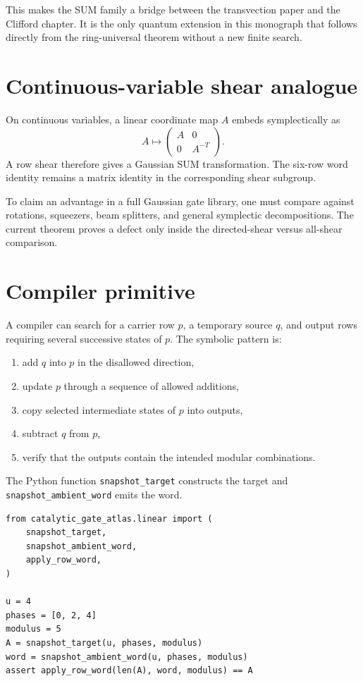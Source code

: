 This makes the SUM family a bridge between the transvection paper and the Clifford chapter.  It is the only quantum extension in this monograph that follows directly from the ring-universal theorem without a new finite search.

\section{Continuous-variable shear analogue}
On continuous variables, a linear coordinate map $A$ embeds symplectically as
\[
A\longmapsto
\begin{pmatrix}
A&0\\
0&A^{-T}
\end{pmatrix}.
\]
A row shear therefore gives a Gaussian SUM transformation.  The six-row word identity remains a matrix identity in the corresponding shear subgroup.

\begin{skeletonbox}
To claim an advantage in a full Gaussian gate library, one must compare against rotations, squeezers, beam splitters, and general symplectic decompositions.  The current theorem proves a defect only inside the directed-shear versus all-shear comparison.
\end{skeletonbox}

\section{Compiler primitive}
A compiler can search for a carrier row $p$, a temporary source $q$, and output rows requiring several successive states of $p$.  The symbolic pattern is:
\begin{enumerate}
\item add $q$ into $p$ in the disallowed direction,
\item update $p$ through a sequence of allowed additions,
\item copy selected intermediate states of $p$ into outputs,
\item subtract $q$ from $p$,
\item verify that the outputs contain the intended modular combinations.
\end{enumerate}
The Python function \texttt{snapshot\_target} constructs the target and \texttt{snapshot\_ambient\_word} emits the word.

\begin{lstlisting}[style=pythonstyle,caption={Constructing a modular snapshot family.}]
from catalytic_gate_atlas.linear import (
    snapshot_target,
    snapshot_ambient_word,
    apply_row_word,
)

u = 4
phases = [0, 2, 4]
modulus = 5
A = snapshot_target(u, phases, modulus)
word = snapshot_ambient_word(u, phases, modulus)
assert apply_row_word(len(A), word, modulus) == A
\end{lstlisting}

